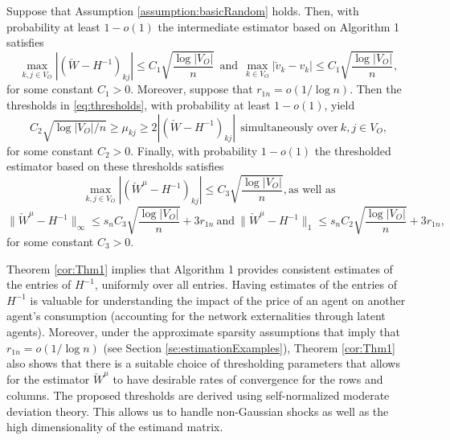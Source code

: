 \documentclass[opre,nonblindrev]{informs3} %
\begin{document}
\begin{theorem}\label{cor:Thm1}
	Suppose that   Assumption \ref{assumption:basicRandom} holds.
Then, with probability at least $1-o(1)$ the intermediate estimator based on Algorithm 1 satisfies
	$$\max_{k,j \in V_O} |(\check W - H^{-1})_{kj} | \leq C_1 \sqrt{\frac{\log |V_O|}{n}} \ \ \mbox{and} \ \ \max_{k\in V_O} |\check v_k - v_k | \leq C_1 \sqrt{\frac{\log |V_O|}{n}},$$
	for some constant $C_1 > 0$.
Moreover, suppose that  $r_{1n}= o(1/\log n)$.
 Then the thresholds in \eqref{eq:thresholds},
 with probability at least $1-o(1)$, yield
\begin{equation} \label{eq:thresholdConstraints}
 C_2 \sqrt{\log|V_O|/n} \geq 
\mu_{kj} \geq 2|(\check W - H^{-1})_{kj}| \ \  \mbox{simultaneously over} \ k,j\in V_O,
\end{equation}
 for some constant $C_2 >0$.
Finally, with probability 
$1-o(1)$
the  thresholded estimator based on these thresholds  satisfies
\begin{equation} \label{eq:Thm2Rates0}
\max_{k,j \in V_O} |(\check W^\mu - H^{-1})_{kj} | \leq C_3 \sqrt{\frac{\log |V_O|}{n}}, \mbox{as well~as}
\end{equation}
\begin{equation} \label{eq:Thm2Rates}
\| \check W^\mu-H^{-1}\|_\infty  \leq s_n C_3 \sqrt{\frac{ \log |V_O|}{n} } + 3r_{1n} \ \mbox{and} \
\|
\check W^\mu-H^{-1}
\|_1 \leq
s_n C_2 \sqrt{\frac{ \log |V_O|}{n}  } + 3r_{1n},
\end{equation}
	for some constant $C_3 > 0$.
\end{theorem}

{Theorem \ref{cor:Thm1} implies that Algorithm 1 provides consistent estimates of the entries of $H^{-1}$, uniformly over all entries. Having
	estimates of the entries of $H^{-1}$ is valuable  for understanding the impact of
	the price of an agent on another  agent's consumption (accounting for the network externalities through latent agents). Moreover, under the approximate sparsity assumptions that imply that
		$r_{1n}= o(1/\log n)$
	(see Section \ref{se:estimationExamples}), Theorem \ref{cor:Thm1} also shows that there is a suitable choice of thresholding parameters that allows for the estimator $\check W^\mu$ to have desirable rates of convergence for the rows and columns. The proposed thresholds are derived using self-normalized moderate deviation theory. This allows us to handle non-Gaussian shocks  as well as the high dimensionality of the estimand matrix.}
\end{document}
